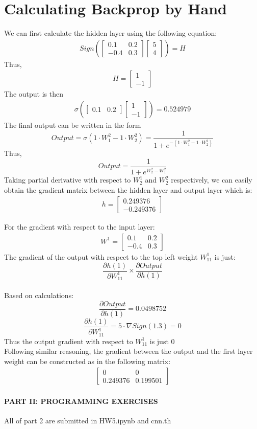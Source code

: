 \documentclass{article}
\begin{document}
\section{Calculating Backprop by Hand}
We can first calculate the hidden layer using the following equation:
\begin{align}
Sign(
\begin{bmatrix}
0.1 & 0.2 \\
-0.4 & 0.3
\end{bmatrix}
\begin{bmatrix}
5\\
4
\end{bmatrix}
)
=
H
\end{align}
Thus,
\begin{align}
H  = 
\begin{bmatrix}
1\\
-1
\end{bmatrix}
\end{align}
The output is then
\begin{align}
\sigma(
\begin{bmatrix}
0.1 & 0.2
\end{bmatrix}
\begin{bmatrix}
1\\
-1
\end{bmatrix}
) =0.524979
\end{align}
The final output can be written in the form
\[Output = \sigma(1\cdot W_{1}^{2}-1\cdot W_{2}^{2})=\frac{1}{1+e^{-(1\cdot W_{1}^{2}-1\cdot W_{2}^{2})}}\]
Thus,
\[Output = \frac{1}{1+e^{W_{2}^{2}-W_{1}^{2}}}\]
Taking partial derivative with respect to $W_{2}^{1}$ and $W_{2}^{2}$ respectively, we can easily obtain the gradient matrix between the hidden layer and output layer which is:
\begin{align}
h = 
\begin{bmatrix}
0.249376\\
-0.249376
\end{bmatrix}
\end{align}

For the gradient with respect to the input layer:
\begin{align}
W^{1} =
\begin{bmatrix}
0.1 & 0.2\\
-0.4 & 0.3
\end{bmatrix}
\end{align}
The gradient of the output with respect to the top left weight $W_{11}^{1}$ is just:
\[\frac{\partial{h(1)}}{\partial{W_{11}^{1}}} \times \frac{\partial{Output}}{\partial{h(1)}}\]
\\Based on calculations:
\[ \frac{\partial{Output}}{\partial{h(1)}} = 0.0498752 \]
\[\frac{\partial{h(1)}}{\partial{W_{11}^{1}}} = 5 \cdot \nabla Sign(1.3) = 0\]  
Thus the output gradient with respect to  $W_{11}^{1}$ is just 0
\\Following similar reasoning, the gradient between the output and the first layer weight can be constructed as in the following matrix:
\begin{align}
\begin{bmatrix}
0 & 0\\
0.249376 & 0.199501
\end{bmatrix}
\end{align}
    \paragraph{PART II: PROGRAMMING EXERCISES}
    
    All of part 2 are submitted  in HW5.ipynb and cnn.th
\end{document}
